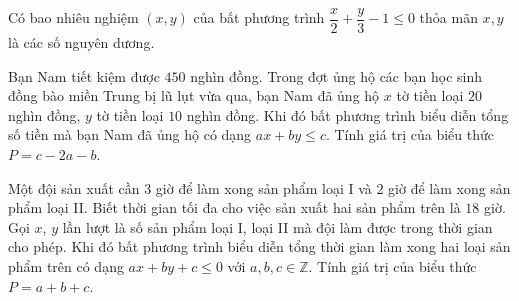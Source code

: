  \begin{ex}%
 	Có bao nhiêu nghiệm $(x,y)$  của bất phương trình $\dfrac{x}{2}+\dfrac{y}{3}-1\le 0$  thỏa mãn $x,y$ là các số nguyên dương.
 \end{ex}
 
 \begin{ex}%
 	Bạn Nam tiết kiệm được $450$ nghìn đồng. Trong đợt ủng hộ các bạn học sinh đồng bào miền Trung bị lũ lụt vừa qua, bạn Nam đã ủng hộ $x$ tờ tiền loại $20$ nghìn đồng, $y$ tờ tiền loại $10$ nghìn đồng. Khi đó bất phương trình biểu diễn tổng số tiền mà bạn Nam đã ủng hộ có dạng $ax+by\le c$. Tính giá trị của biểu thức $P=c-2a-b$.
 \end{ex}
 
 \begin{ex}%
 	Một đội sản xuất cần $3$ giờ để làm xong sản phẩm loại I và $2$ giờ để làm xong sản phẩm loại II. Biết thời gian tối đa cho việc sản xuất hai sản phẩm trên là $18$ giờ. Gọi $x$, $y$ lần lượt là số sản phẩm loại I, loại II mà đội làm được trong thời gian cho phép. Khi đó bất phương trình biểu diễn tổng thời gian làm xong hai loại sản phẩm trên có dạng $ax+by+c\le 0$ với $a,b,c\in\mathbb{Z}$. Tính giá trị của biểu thức $P=a+b+c$.
 \end{ex}
 
